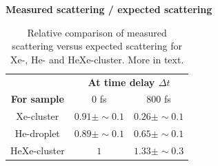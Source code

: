\begin{table}%
\centering
\textbf{Measured scattering / expected scattering}\\
\begin{tabular}{ | c || c | c | }
\hline
	 &\multicolumn{2}{c|}{\textbf{At time delay $\Delta t$}} \\
	\textbf{For sample} & 0 fs  & 800 fs \\ \hline \hline
	Xe-cluster & $0.91\pm \sim 0.1$ & $0.26\pm \sim 0.1$ \\ \hline
	He-droplet & $0.89\pm \sim 0.1$ & $0.65\pm \sim 0.1$ \\ \hline
	HeXe-cluster & $1$ & $1.33\pm \sim 0.3$ \\ \hline
\end{tabular}
\caption[Relative comparison of measured scattering versus expected scattering.]{Relative comparison of measured scattering versus expected scattering for Xe-, He- and HeXe-cluster. More in text.}
\label{tab:he-vs-xe-vs-hexe-summary}
\end{table}

